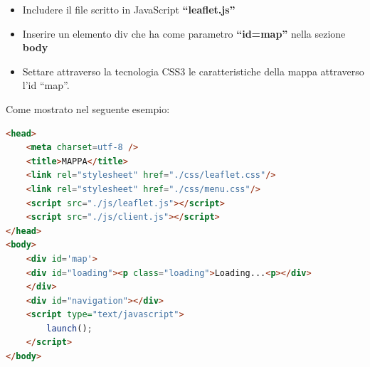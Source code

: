 \documentclass[a4paper,11pt]{article}
\begin{document}
\begin{enumerate}
\begin{enumerate}[label*=\arabic*.]
\begin{itemize}
				\item Includere il file scritto in JavaScript \textbf{"`leaflet.js"'}
				\item Inserire un elemento div che ha come parametro \textbf{"`id=map"'} nella sezione \textbf{body}
				\item Settare attraverso la tecnologia CSS3 le caratteristiche della mappa attraverso l'id "`map"'.				
			\end{itemize}
Come mostrato nel seguente esempio:
\begin{lstlisting}[language=HTML, basicstyle=\small]
<head>
	<meta charset=utf-8 />
	<title>MAPPA</title>
	<link rel="stylesheet" href="./css/leaflet.css"/>
	<link rel="stylesheet" href="./css/menu.css"/>		
	<script src="./js/leaflet.js"></script>
	<script src="./js/client.js"></script>		
</head>
<body>		
	<div id='map'>
	<div id="loading"><p class="loading">Loading...<p></div>
	</div>					
	<div id="navigation"></div>		
	<script type="text/javascript">
		launch();
	</script>
</body>
\end{lstlisting}\newpage


\end{enumerate}
\end{enumerate}
\end{document}
